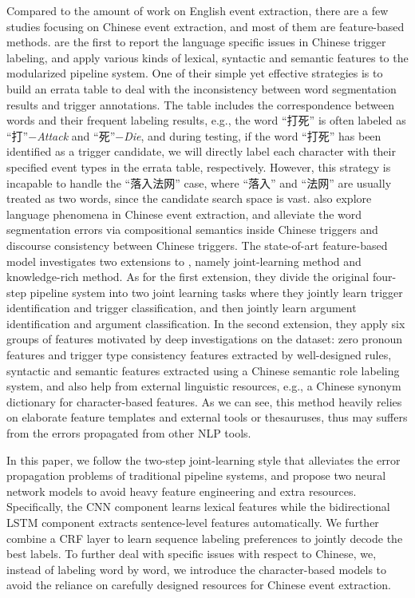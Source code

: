 Compared to the amount of work on English event extraction, there are a few studies focusing on Chinese event extraction, and most of them are feature-based methods.  are the first to report the language specific issues in Chinese trigger labeling, and apply various kinds of lexical, syntactic and semantic features to the modularized pipeline system.  One of their simple yet effective strategies is to build an errata table to deal with the inconsistency between word segmentation results and trigger annotations. The table includes the correspondence between words and their frequent labeling results, e.g., the word ``打死'' is often labeled as ``打''$-$\emph{Attack} and ``死''$-$\emph{Die}, and during testing, if the word ``打死''  has been identified as a trigger candidate, we will directly label each character with their specified event types in the errata table, respectively.  However, this strategy is incapable to handle the ``落入法网'' case, where ``落入'' and ``法网'' are usually treated as two words, since the candidate search space is vast. 
  also explore language phenomena in Chinese event extraction, and alleviate the word segmentation errors via compositional semantics inside Chinese triggers and discourse consistency between Chinese triggers. The state-of-art feature-based model investigates two extensions to , namely joint-learning method and knowledge-rich method. As for the first extension, they divide the original four-step pipeline system into two joint learning tasks where they jointly learn trigger identification and trigger classification, and then jointly learn argument identification and argument classification. In the second extension, they apply six groups of features motivated by deep investigations on the dataset: zero pronoun features and trigger type consistency features  extracted by well-designed rules,  syntactic and semantic features extracted using a Chinese semantic role labeling system, and also help from external linguistic resources, e.g.,  a Chinese synonym dictionary for character-based features. As we can see,  this method heavily relies on elaborate feature templates and external tools or thesauruses, thus may suffers from the errors propagated from other NLP tools.

In this paper, we follow the two-step joint-learning style that alleviates the error propagation problems of traditional pipeline systems, and propose two neural network models to avoid heavy feature engineering and extra resources. Specifically, the CNN component learns lexical features while the bidirectional LSTM component extracts sentence-level features automatically. We further combine a CRF layer to learn sequence labeling preferences to jointly decode the best labels. %
To further deal with specific issues with respect to Chinese, we,  instead of labeling word by word, we introduce the character-based models to avoid the reliance on carefully designed resources for Chinese event extraction.
